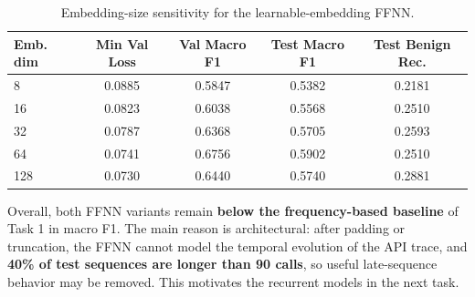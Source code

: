 \begin{table}[H]
\small
\centering
\caption{Embedding-size sensitivity for the learnable-embedding FFNN.}
\label{tab:task2_embedding_sizes}
\begin{tabular}{lcccc}
\toprule
\textbf{Emb. dim} & \textbf{Min Val Loss} & \textbf{Val Macro F1} & \textbf{Test Macro F1} & \textbf{Test Benign Rec.} \\
\midrule
8 & 0.0885 & 0.5847 & 0.5382 & 0.2181 \\
16 & 0.0823 & 0.6038 & 0.5568 & 0.2510 \\
32 & 0.0787 & 0.6368 & 0.5705 & 0.2593 \\
64 & 0.0741 & 0.6756 & 0.5902 & 0.2510 \\
128 & 0.0730 & 0.6440 & 0.5740 & 0.2881 \\
\bottomrule
\end{tabular}
\end{table}

Overall, both FFNN variants remain \textbf{below the frequency-based baseline} of Task 1 in macro F1. The main reason is architectural: after padding or truncation, the FFNN cannot model the temporal evolution of the API trace, and \textbf{40\% of test sequences are longer than 90 calls}, so useful late-sequence behavior may be removed. This motivates the recurrent models in the next task.
